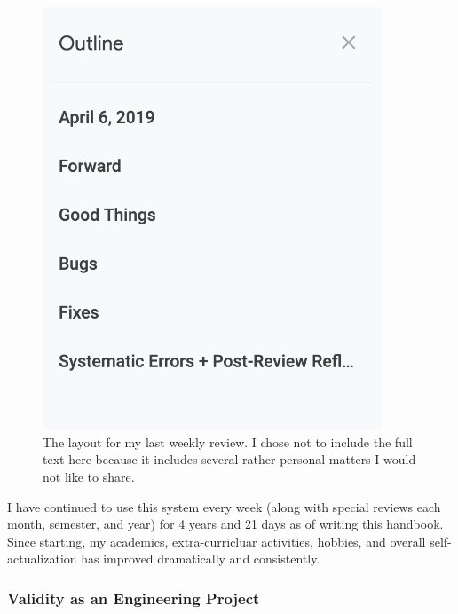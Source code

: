 \documentclass[a4paper,12pt]{article}
\begin{document}
\begin{figure}[H]
\centering
\includegraphics[width=0.9\textwidth]{img/image022.png}
\caption{The layout for my last weekly review. I chose not to include the full text here because it includes several rather personal matters I would not like to share.}
\label{}
\end{figure}

I have continued to use this system every week (along with special reviews each month, semester, and year) for 4 years and 21 days as of writing this handbook. Since starting, my academics, extra-curricluar activities, hobbies, and overall self-actualization has improved dramatically and consistently.

\subsubsection{Validity as an Engineering Project}
\end{document}
